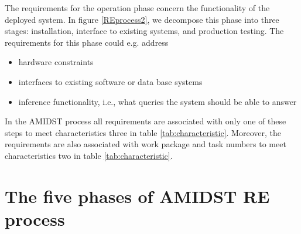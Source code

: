 \documentclass[11pt, oneside]{article}   	%
\begin{document}
The requirements for the operation phase concern the functionality of the deployed system. In figure \ref{REprocess2}, we decompose this phase into three stages: installation, interface to existing systems, and production testing. The requirements for this phase could e.g. address
\begin{itemize}
 \item hardware constraints
 \item interfaces to existing software or data base systems
 \item inference functionality, i.e., what queries the system should be able to answer
\end{itemize}

In the AMIDST process all requirements are associated with only one of these steps to meet characteristics three in table  \ref{tab:characteristic}.  Moreover, the requirements are also associated with work package and task numbers to meet characteristics two in table \ref{tab:characteristic}.

\section{The five phases of AMIDST RE process}
\label{sec:reprocess}
\end{document}
